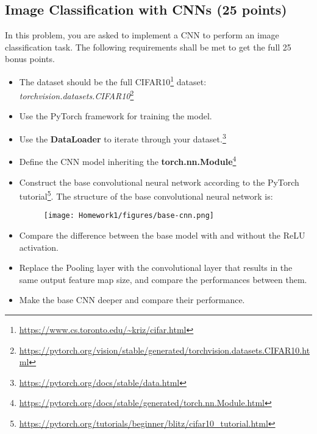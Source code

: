 \subsection{Image Classification with CNNs (25 points)}
In this problem, you are asked to implement a CNN to perform an image classification task. The following requirements shall be met to get the full 25 bonus points.
\begin{itemize}
    \item The dataset should be the full CIFAR10\footnote{\url{https://www.cs.toronto.edu/~kriz/cifar.html}} dataset: \textit{torchvision.datasets.CIFAR10}\footnote{\url{https://pytorch.org/vision/stable/generated/torchvision.datasets.CIFAR10.html}}
    \item Use the PyTorch framework for training the model.
    \item Use the \textbf{DataLoader} to iterate through your dataset.\footnote{\url{https://pytorch.org/docs/stable/data.html}}
    \item Define the CNN model inheriting the \textbf{torch.nn.Module}\footnote{\url{https://pytorch.org/docs/stable/generated/torch.nn.Module.html}}
    \item Construct the base convolutional neural network according to the PyTorch tutorial\footnote{\url{https://pytorch.org/tutorials/beginner/blitz/cifar10_tutorial.html}}. The structure of the base convolutional neural network is: 
    \begin{figure}[h]
        \centering
        \texttt{[image: Homework1/figures/base-cnn.png]}
    \end{figure}
    \item Compare the difference between the base model with and without the ReLU activation.
    \item Replace the Pooling layer with the convolutional layer that results in the same output feature map size, and compare the performances between them. 
    \item Make the base CNN deeper and compare their performance.
\end{itemize}

